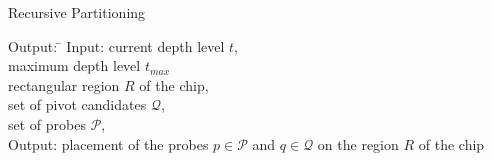 \documentclass{llncs}
\begin{document}
\begin{algorithm}
\caption{Recursive Partitioning}
\label{alg:recursivepart}
\begin{minipage}{4.8in}

\begin{tabbing}
Output: \=                                  \kill
Input:  \> current depth level $t$,                     \\
        \> maximum depth level $t_{max}$                    \\
        \> rectangular region $R$ of the chip,                  \\
        \> set of pivot candidates $\mathcal{Q}$,               \\
        \> set of probes $\mathcal{P}$,                     \\
Output: \> placement of the probes $p \in \mathcal{P}$ and
           $q \in \mathcal{Q}$ on the region $R$ of the chip
\end{tabbing}


\end{minipage}
\end{algorithm}
\end{document}
